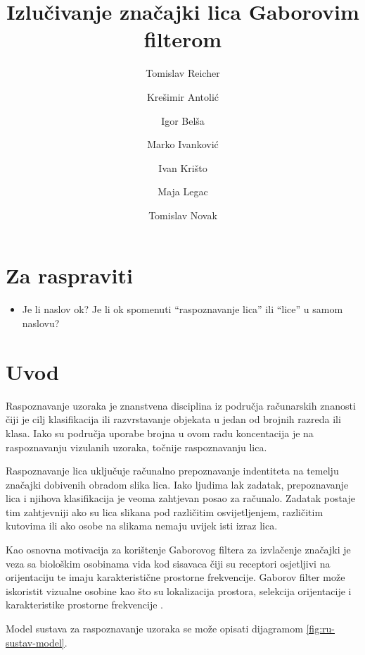 \documentclass{article}
\begin{document}
\title{Izlučivanje značajki lica Gaborovim filterom}
\author{Tomislav Reicher \and Krešimir Antolić \and Igor Belša \and Marko Ivanković \and Ivan Krišto \and Maja Legac \and Tomislav Novak}

\maketitle

\tableofcontents

\section*{Za raspraviti}
\begin{itemize}
  \item Je li naslov ok? Je li ok spomenuti ``raspoznavanje lica'' ili ``lice''
  u samom naslovu?
\end{itemize}

\section{Uvod}
Raspoznavanje uzoraka je znanstvena disciplina iz područja računarskih znanosti
čiji je cilj klasifikacija ili razvrstavanje objekata u jedan od brojnih razreda
ili klasa. Iako su područja uporabe brojna u ovom radu koncentacija je na
raspoznavanju vizulanih uzoraka, točnije raspoznavanju lica.

Raspoznavanje lica uključuje računalno prepoznavanje indentiteta na temelju
značajki dobivenih obradom slika lica. Iako ljudima lak zadatak, prepoznavanje
lica i njihova klasifikacija je veoma zahtjevan posao za računalo. Zadatak
postaje tim zahtjevniji ako su lica slikana pod različitim osvijetljenjem,
različitim kutovima ili ako osobe na slikama nemaju uvijek isti izraz lica.

Kao osnovna motivacija za korištenje Gaborovog filtera za izvlačenje značajki je
veza sa biološkim osobinama vida kod sisavaca čiji su receptori osjetljivi na
orijentaciju te imaju karakteristične prostorne frekvencije. Gaborov filter može
iskoristit vizualne osobine kao što su lokalizacija prostora, selekcija
orijentacije i karakteristike prostorne frekvencije
\citep{bhuiyan2007onfacerecognition}\nocite{daugman1985uncertainty}.

Model sustava za raspoznavanje uzoraka se može opisati dijagramom
\ref{fig:ru-sustav-model}.
\end{document}
